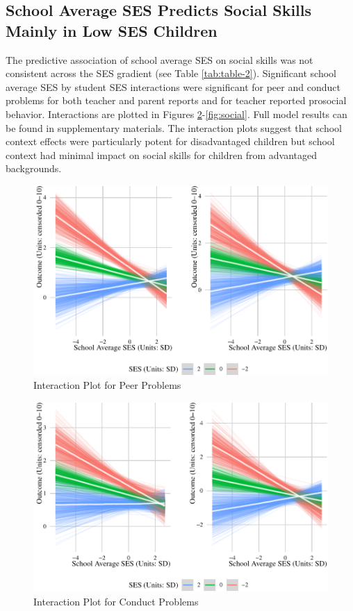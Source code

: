 \documentclass[
  english,
  man]{apa6}
\begin{document}
\hypertarget{school-average-ses-predicts-social-skills-mainly-in-low-ses-children}{%
\subsection{School Average SES Predicts Social Skills Mainly in Low SES Children}\label{school-average-ses-predicts-social-skills-mainly-in-low-ses-children}}

The predictive association of school average SES on social skills was not consistent across the SES gradient (see Table \ref{tab:table-2}). Significant school average SES by student SES interactions were significant for peer and conduct problems for both teacher and parent reports and for teacher reported prosocial behavior. Interactions are plotted in Figures \ref{fig:conduct}-\ref{fig:social}. Full model results can be found in supplementary materials. The interaction plots suggest that school context effects were particularly potent for disadvantaged children but school context had minimal impact on social skills for children from advantaged backgrounds.

\begin{figure}
\centering
\includegraphics{manuscript_files/figure-latex/peer-1.pdf}
\caption{\label{fig:peer}Interaction Plot for Peer Problems}
\end{figure}

\begin{figure}
\centering
\includegraphics{manuscript_files/figure-latex/conduct-1.pdf}
\caption{\label{fig:conduct}Interaction Plot for Conduct Problems}
\end{figure}
\end{document}
